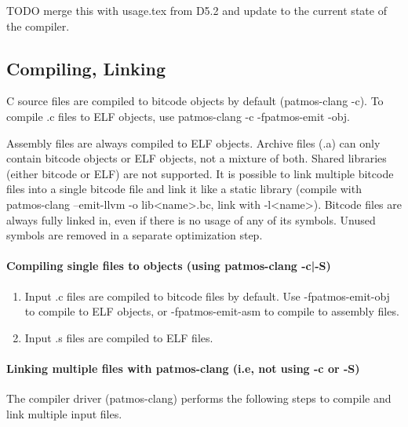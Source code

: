 TODO merge this with usage.tex from D5.2 and update to the current state of the compiler.


\subsection{Compiling, Linking}

C source files are compiled to bitcode objects by default (patmos-clang -c). To compile .c files
to ELF objects, use patmos-clang -c -fpatmos-emit -obj.

Assembly files are always compiled to ELF objects. Archive files (.a) can only contain bitcode objects
or ELF objects, not a mixture of both. Shared libraries (either bitcode or ELF) are not supported.
It is possible to link multiple bitcode files into a single bitcode file and link it like a static library
(compile with patmos-clang --emit-llvm -o lib<name>.bc, link with -l<name>). Bitcode files are always
fully linked in, even if there is no usage of any of its symbols. Unused symbols are removed in a separate
optimization step.


\paragraph{Compiling single files to objects (using patmos-clang -c|-S)}

\begin{enumerate}
\item Input .c files are compiled to bitcode files by default. Use -fpatmos-emit-obj to compile
   to ELF objects, or -fpatmos-emit-asm to compile to assembly files.

\item Input .s files are compiled to ELF files.
\end{enumerate}


\paragraph{Linking multiple files with patmos-clang (i.e, not using -c or -S)}

The compiler driver (patmos-clang) performs the following steps to compile and link multiple input files.

